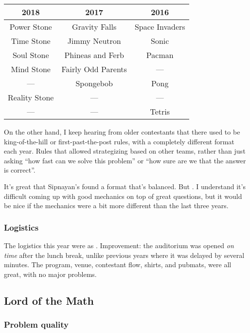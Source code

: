 \documentclass[11pt,paper=letter]{scrartcl}
\begin{document}
\begin{center}
\begin{tabular}{c | c | c}
  2018 & 2017 & 2016 \\ \hline
  Power Stone & Gravity Falls & Space Invaders \\
  Time Stone & Jimmy Neutron & Sonic \\
  Soul Stone & Phineas and Ferb & Pacman \\
  Mind Stone & Fairly Odd Parents & --- \\
  --- & Spongebob & Pong \\
  Reality Stone & --- & --- \\
  --- & --- & Tetris
\end{tabular}
\end{center}

On the other hand, I keep hearing from older contestants that there used to be king-of-the-hill or first-past-the-post rules, with a completely different format each year. Rules that allowed strategizing based on other teams, rather than just asking ``how fast can we solve this problem'' or ``how sure are we that the answer is correct''.

It's great that Sipnayan's found a format that's balanced. But . I understand it's difficult coming up with good mechanics on top of great questions, but it would be nice if the mechanics were a bit more different than the last three years.

\subsubsection*{Logistics}

The logistics this year were as . Improvement: the auditorium was opened \emph{on time} after the lunch break, unlike previous years where it was delayed by several minutes. The program, venue, contestant flow, shirts, and pubmats, were all great, with no major problems.

\subsection{Lord of the Math}

\subsubsection*{Problem quality}
\end{document}
